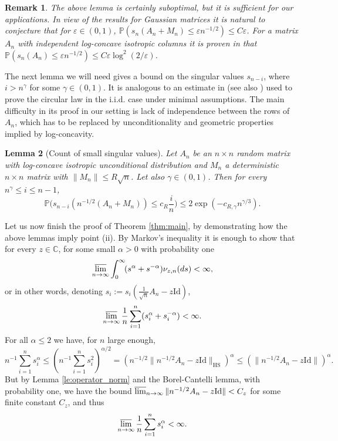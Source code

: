 \documentclass[12pt,reqno]{amsart}
\newtheorem{lemma}{Lemma}[section]
\newtheorem{remark}[lemma]{Remark}
\begin{document}
\begin{remark} The above lemma is certainly suboptimal, but it is sufficient
  for our applications. In view of the results for Gaussian matrices
  \cite{SSTSmoothed} it is natural to conjecture that for $\varepsilon \in
  (0,1)$, ${\mathbb{P}}(s_n(A_n+M_n) \le \varepsilon n^{-1/2}) \le C\varepsilon$. For a
  matrix $A_n$ with independent log-concave isotropic columns it is proven in
  \cite{AGLPT2} that ${\mathbb{P}}(s_n(A_n) \le \varepsilon n^{-1/2}) \le C\varepsilon
  \log^2(2/\varepsilon)$.
\end{remark}

The next lemma we will need gives a bound on the singular values $s_{n-i}$,
where $i > n^{\gamma}$ for some $\gamma \in (0,1)$. It is analogous to an
estimate in \cite{TV} (see also \cite{BCAround}) used to prove the circular
law in the i.i.d. case under minimal assumptions. The main difficulty in its
proof in our setting is lack of independence between the rows of $A_n$, which
has to be replaced by unconditionality and geometric properties implied by
log-concavity.

\begin{lemma}[Count of small singular values]\label{le:small_sv}
  Let $A_n$ be an $n\times n$ random matrix with log-concave isotropic
  unconditional distribution and $M_n$ a deterministic $n\times n$ matrix with
  $\|M_n\| \le R\sqrt{n}$. Let also $\gamma \in (0,1)$. Then for every
  $n^{\gamma} \le i \le n-1$,
  \[
  {\mathbb{P}}\Big(s_{n-i}(n^{-1/2}(A_n + M_n))   \le c_R \frac{i}{n}\Big) \le 2\exp(-c_{R,\gamma} n^{\gamma/3}).
  \]
\end{lemma}

Let us now finish the proof of Theorem \ref{thm:main}, by demonstrating how
the above lemmas imply point (ii). By Markov's inequality it is enough to show
that for every $z \in {\mathbb{C}}$, for some small $\alpha > 0$ with probability one
\[
\varlimsup_{n\to\infty} \int_0^\infty\!(s^{\alpha} + s^{-\alpha})\nu_{z,n}(ds) < \infty,
\]
or in other words, denoting $s_i := s_i(\frac{1}{\sqrt{n}} A_n - z{\mathrm{Id}})$,
\[
\varlimsup_{n\to\infty}\frac{1}{n} \sum_{i=1}^n( s_i^\alpha +
s_i^{-\alpha})<\infty.
\]
For all $\alpha \le 2$ we have, for $n$ large enough,
\[
n^{-1}\sum_{i=1}^n s_i^\alpha \le (n^{-1} \sum_{i=1}^n s_i^2)^{\alpha/2} =
(n^{-1/2}\|n^{-1/2} A_n - z{\mathrm{Id}}\|_{\mathrm{HS}})^{\alpha} \le (\|n^{-1/2}A_n -
z{\mathrm{Id}}\|)^\alpha.
\]
But by Lemma \ref{le:operator_norm} and the Borel-Cantelli lemma, with
probability one, we have the bound $\varlimsup_{n\to \infty} \|n^{-1/2}A_n -
z{\mathrm{Id}}\| < C_z$ for some finite constant $C_z$, and thus
\[
\varlimsup_{n\to\infty} \frac{1}{n} \sum_{i=1}^n s_i^\alpha < \infty.
\]
\end{document}
